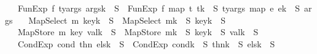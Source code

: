 \begin{isabellebody}
\ \ {\isacharbar}{\kern0pt}\ {\isachardoublequoteopen}{\isacharparenleft}{\kern0pt}FunExp\ f\ ty{\isacharunderscore}{\kern0pt}args\ args{\isacharparenright}{\kern0pt}{\isacharbrackleft}{\kern0pt}k\ {\isasymmapsto}\isactrlsub {\isasymtau}\ S{\isacharbrackright}{\kern0pt}\ {\isacharequal}{\kern0pt}\ FunExp\ f\ {\isacharparenleft}{\kern0pt}map\ {\isacharparenleft}{\kern0pt}{\isasymlambda}t{\isachardot}{\kern0pt}\ t{\isacharbrackleft}{\kern0pt}k\ {\isasymmapsto}\isactrlsub {\isasymtau}\ S{\isacharbrackright}{\kern0pt}\isactrlsub {\isasymtau}{\isacharparenright}{\kern0pt}\ ty{\isacharunderscore}{\kern0pt}args{\isacharparenright}{\kern0pt}\ {\isacharparenleft}{\kern0pt}map\ {\isacharparenleft}{\kern0pt}{\isasymlambda}e{\isachardot}{\kern0pt}\ e{\isacharbrackleft}{\kern0pt}k\ {\isasymmapsto}\isactrlsub {\isasymtau}\ S{\isacharbrackright}{\kern0pt}{\isacharparenright}{\kern0pt}\ args{\isacharparenright}{\kern0pt}{\isachardoublequoteclose}\isanewline
\ \ {\isacharbar}{\kern0pt}\ {\isachardoublequoteopen}{\isacharparenleft}{\kern0pt}MapSelect\ m\ key{\isacharparenright}{\kern0pt}{\isacharbrackleft}{\kern0pt}k\ {\isasymmapsto}\isactrlsub {\isasymtau}\ S{\isacharbrackright}{\kern0pt}\ {\isacharequal}{\kern0pt}\ MapSelect\ {\isacharparenleft}{\kern0pt}m{\isacharbrackleft}{\kern0pt}k\ {\isasymmapsto}\isactrlsub {\isasymtau}\ S{\isacharbrackright}{\kern0pt}{\isacharparenright}{\kern0pt}\ {\isacharparenleft}{\kern0pt}key{\isacharbrackleft}{\kern0pt}k\ {\isasymmapsto}\isactrlsub {\isasymtau}\ S{\isacharbrackright}{\kern0pt}{\isacharparenright}{\kern0pt}{\isachardoublequoteclose}\isanewline
\ \ {\isacharbar}{\kern0pt}\ {\isachardoublequoteopen}{\isacharparenleft}{\kern0pt}MapStore\ m\ key\ val{\isacharparenright}{\kern0pt}{\isacharbrackleft}{\kern0pt}k\ {\isasymmapsto}\isactrlsub {\isasymtau}\ S{\isacharbrackright}{\kern0pt}\ {\isacharequal}{\kern0pt}\ MapStore\ {\isacharparenleft}{\kern0pt}m{\isacharbrackleft}{\kern0pt}k\ {\isasymmapsto}\isactrlsub {\isasymtau}\ S{\isacharbrackright}{\kern0pt}{\isacharparenright}{\kern0pt}\ {\isacharparenleft}{\kern0pt}key{\isacharbrackleft}{\kern0pt}k\ {\isasymmapsto}\isactrlsub {\isasymtau}\ S{\isacharbrackright}{\kern0pt}{\isacharparenright}{\kern0pt}\ {\isacharparenleft}{\kern0pt}val{\isacharbrackleft}{\kern0pt}k\ {\isasymmapsto}\isactrlsub {\isasymtau}\ S{\isacharbrackright}{\kern0pt}{\isacharparenright}{\kern0pt}{\isachardoublequoteclose}\isanewline
\ \ {\isacharbar}{\kern0pt}\ {\isachardoublequoteopen}{\isacharparenleft}{\kern0pt}CondExp\ cond\ thn\ els{\isacharparenright}{\kern0pt}{\isacharbrackleft}{\kern0pt}k\ {\isasymmapsto}\isactrlsub {\isasymtau}\ S{\isacharbrackright}{\kern0pt}\ {\isacharequal}{\kern0pt}\ CondExp\ {\isacharparenleft}{\kern0pt}cond{\isacharbrackleft}{\kern0pt}k\ {\isasymmapsto}\isactrlsub {\isasymtau}\ S{\isacharbrackright}{\kern0pt}{\isacharparenright}{\kern0pt}\ {\isacharparenleft}{\kern0pt}thn{\isacharbrackleft}{\kern0pt}k\ {\isasymmapsto}\isactrlsub {\isasymtau}\ S{\isacharbrackright}{\kern0pt}{\isacharparenright}{\kern0pt}\ {\isacharparenleft}{\kern0pt}els{\isacharbrackleft}{\kern0pt}k\ {\isasymmapsto}\isactrlsub {\isasymtau}\ S{\isacharbrackright}{\kern0pt}{\isacharparenright}{\kern0pt}{\isachardoublequoteclose}\isanewline

\end{isabellebody}
